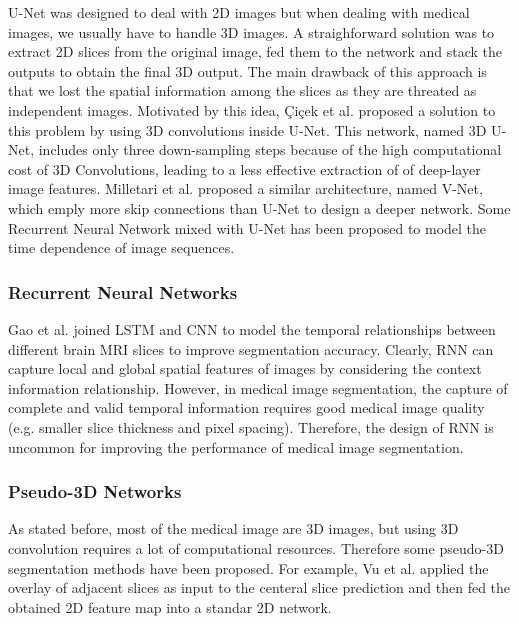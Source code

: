 U-Net was designed to deal with 2D images but when dealing with medical images,
we usually have to handle 3D images. A straighforward solution was to extract 2D
slices from the original image, fed them to the network and stack the outputs to
obtain the final 3D output.
The main drawback of this approach is that we lost the spatial information among
the slices as they are threated as independent images. Motivated by this idea,
Çiçek et al. proposed a solution to this problem by using 3D convolutions inside
U-Net. This network, named 3D U-Net, includes only three down-sampling steps
because of the high computational cost of 3D Convolutions, leading to a less
effective extraction of of deep-layer image features.
Milletari et al. proposed a similar architecture, named V-Net, which emply more
skip connections than U-Net to design a deeper network.
Some Recurrent Neural Network mixed with U-Net has been proposed to model the
time dependence of image sequences.

\subsubsection{Recurrent Neural Networks}
Gao et al. joined LSTM and CNN to model the temporal relationships between
different brain MRI slices to improve segmentation accuracy. Clearly, RNN can
capture local and global spatial features of images by considering the context
information
relationship. However, in medical image segmentation, the capture of complete
and valid temporal information requires good medical image quality (e.g. smaller
slice thickness and pixel spacing). Therefore, the design of RNN is uncommon for
improving the performance of medical image segmentation.

\subsubsection{Pseudo-3D Networks}
As stated before, most of the medical image are 3D images, but using 3D
convolution requires a lot of computational resources. Therefore some pseudo-3D
segmentation methods have been proposed. For example, Vu et al. applied the
overlay of adjacent slices as input to the centeral slice prediction and then
fed the obtained 2D feature map into a standar 2D network.

